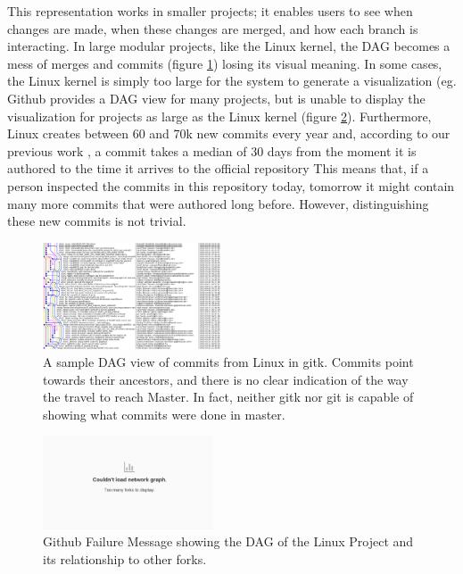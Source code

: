 \documentclass[conference, draftclsnofoot, draft]{IEEEtran}
\begin{document}
This representation works in smaller projects; it enables users to see
when changes are made, when these changes are merged, and how each branch is
interacting.  
In large modular projects, like the Linux kernel, the DAG becomes a
mess of merges and commits (figure \ref{fig:gitk}) losing its visual meaning.  In
some cases, the Linux kernel is simply too large for the system to generate a
visualization (eg. Github provides a DAG view for many projects, but is unable to
display the visualization for projects as large as the Linux kernel (figure
\ref{fig:gitfail}).
Furthermore, Linux creates between 60 and 70k new commits every year and, according to our previous work \cite{German2015}, 
a commit takes a median of 30 days from the moment it is authored to the time it arrives to the official repository
This means that, if a person inspected the commits in this repository today, tomorrow it might contain  many more
commits that were authored long before. However, distinguishing these new commits is not trivial. 

\begin{figure}
        \centering
        \includegraphics[width=0.47\textwidth]{figures/gitk.png}
        \caption{A sample DAG view of commits from Linux in gitk. Commits point towards their ancestors, and there is no clear indication of the way the travel
          to reach Master. In fact, neither gitk nor git is capable of showing what commits were done in master.}
        \label{fig:gitk}
\end{figure}

\begin{figure}
        \centering
        \includegraphics[width=0.45\textwidth]{figures/github_viewer.png}
        \caption{Github Failure Message showing the DAG of the Linux Project and its relationship to other forks.}
        \label{fig:gitfail}
\end{figure}
\end{document}
